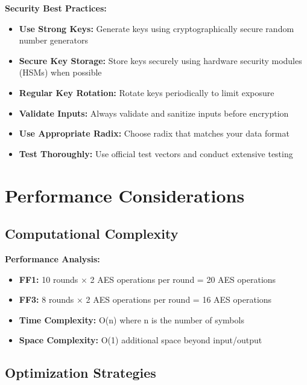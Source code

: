 \documentclass[11pt,a4paper]{article}
\begin{document}
\begin{warningbox}
\textbf{Security Best Practices:}
\begin{itemize}
    \item \textbf{Use Strong Keys:} Generate keys using cryptographically secure random number generators
    \item \textbf{Secure Key Storage:} Store keys securely using hardware security modules (HSMs) when possible
    \item \textbf{Regular Key Rotation:} Rotate keys periodically to limit exposure
    \item \textbf{Validate Inputs:} Always validate and sanitize inputs before encryption
    \item \textbf{Use Appropriate Radix:} Choose radix that matches your data format
    \item \textbf{Test Thoroughly:} Use official test vectors and conduct extensive testing
\end{itemize}
\end{warningbox}

\section{Performance Considerations}

\subsection{Computational Complexity}

\begin{mathbox}
\textbf{Performance Analysis:}
\begin{itemize}
    \item \textbf{FF1:} 10 rounds × 2 AES operations per round = 20 AES operations
    \item \textbf{FF3:} 8 rounds × 2 AES operations per round = 16 AES operations
    \item \textbf{Time Complexity:} O(n) where n is the number of symbols
    \item \textbf{Space Complexity:} O(1) additional space beyond input/output
\end{itemize}
\end{mathbox}

\subsection{Optimization Strategies}
\end{document}
